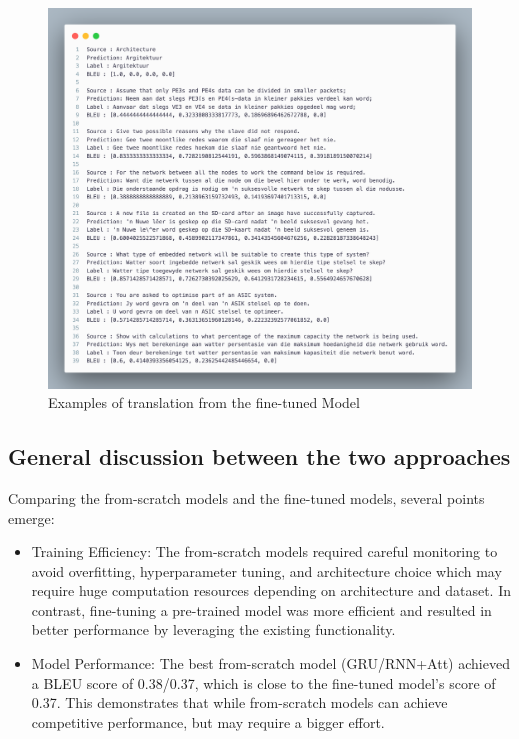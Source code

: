 \begin{figure}[H]
	\centering
	\includegraphics[width=\linewidth]{./figures/example.png}
	\caption{Examples of translation from the fine-tuned Model}
	\label{fig:example}
\end{figure}



\subsection{General discussion between the two approaches}
Comparing the from-scratch models and the fine-tuned models, several points emerge:
\begin{itemize}
	\item Training Efficiency: The from-scratch models required careful monitoring to avoid overfitting, hyperparameter tuning, and architecture choice which may require huge computation resources depending on architecture and dataset. In contrast, fine-tuning a pre-trained model was more efficient and resulted in better performance by leveraging the existing functionality.

	\item Model Performance: The best from-scratch model (GRU/RNN+Att) achieved a BLEU score of 0.38/0.37, which is close to the fine-tuned model's score of 0.37. This demonstrates that while from-scratch models can achieve competitive performance, but may require a bigger effort.
\end{itemize}

